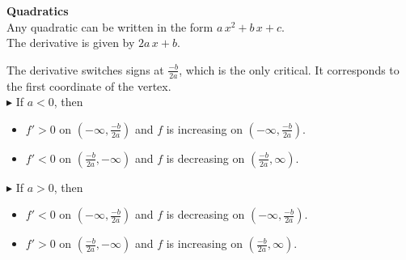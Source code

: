 \documentclass{ximera}
\begin{document}
\begin{example} \textbf{\textcolor{blue!55!black}{Quadratics}} \\


Any quadratic can be written in the form $a \, x^2 + b \, x + c$. \\

The derivative is given by $2a \, x + b$.


The derivative switches signs at $\frac{-b}{2a}$, which is the only critical. It corresponds to the first coordinate of the vertex. \\



\textbf{\textcolor{red!90!darkgray}{$\blacktriangleright$}} If $a < 0$, then 

\begin{itemize}
\item $f' > 0$ on $\left( -\infty, \frac{-b}{2a} \right)$ and $f$ is increasing on $\left( -\infty, \frac{-b}{2a} \right)$. \\
\item $f' < 0$ on $\left( \frac{-b}{2a}, -\infty \right)$ and $f$ is decreasing on $\left( \frac{-b}{2a}, \infty \right)$. 
\end{itemize}







\textbf{\textcolor{red!90!darkgray}{$\blacktriangleright$}} If $a > 0$, then 

\begin{itemize}
\item $f' < 0$ on $\left( -\infty, \frac{-b}{2a} \right)$ and $f$ is decreasing on $\left( -\infty, \frac{-b}{2a} \right)$. \\
\item $f' > 0$ on $\left( \frac{-b}{2a}, -\infty \right)$ and $f$ is increasing on $\left( \frac{-b}{2a}, \infty \right)$. 
\end{itemize}






\end{example}
\end{document}
